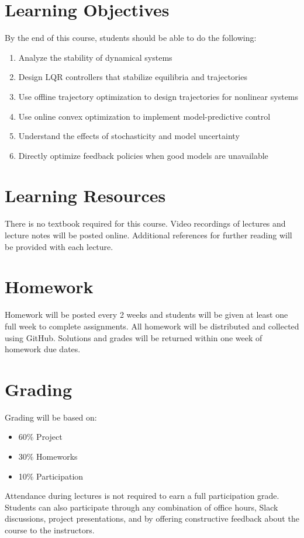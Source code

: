 \documentclass[11pt,letterpaper]{article}
\begin{document}
\section*{Learning Objectives}
By the end of this course, students should be able to do the following:
\begin{enumerate}
	\item Analyze the stability of dynamical systems
	\item Design LQR controllers that stabilize equilibria and trajectories
	\item Use offline trajectory optimization to design trajectories for nonlinear systems
	\item Use online convex optimization to implement model-predictive control
	\item Understand the effects of stochasticity and model uncertainty
	\item Directly optimize feedback policies when good models are unavailable
	
\end{enumerate}

\section*{Learning Resources}

There is no textbook required for this course. Video recordings of lectures and lecture notes will be posted online. Additional references for further reading will be provided with each lecture.

\section*{Homework}

Homework will be posted every 2 weeks and students will be given at least one full week to complete assignments. All homework will be distributed and collected using GitHub. Solutions and grades will be returned within one week of homework due dates.

\section*{Grading}

Grading will be based on:
\begin{itemize}
	\item 60\% Project
	\item 30\% Homeworks
	\item 10\% Participation
\end{itemize}
Attendance during lectures is not required to earn a full participation grade. Students can also participate through any combination of office hours, Slack discussions, project presentations, and by offering constructive feedback about the course to the instructors.
\end{document}
